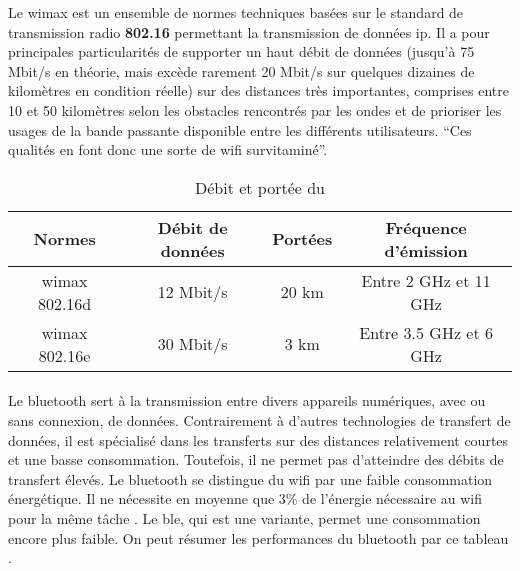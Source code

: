 Le \gls{wimax} est un ensemble de normes techniques basées sur le standard de transmission radio \textbf{802.16}
permettant la transmission de données \gls{ip}.\newline
Il a pour principales particularités de supporter un haut débit de données (jusqu’à 75 Mbit/s en théorie, mais
excède rarement 20 Mbit/s sur quelques dizaines de kilomètres en condition réelle) sur des distances très importantes,
comprises entre 10 et 50 kilomètres selon les obstacles rencontrés par les ondes et de prioriser les usages de
la bande passante disponible entre les différents utilisateurs. \enquote{Ces qualités en font donc une sorte
    de \gls{wifi} survitaminé}{\cite{wimax}}.

\begin{table}[H]
    \centering
    \begin{tabular}{|c|c|c|c|}
        \hline
        \rowcolor{tableColorDark} Normes & Débit de données & Portées & Fréquence d'émission   \\
        \hline

        \gls{wimax} 802.16d              & 12 Mbit/s        & 20 km   & Entre 2 GHz et 11 GHz  \\\hline
        \gls{wimax} 802.16e              & 30 Mbit/s        & 3 km    & Entre 3.5 GHz et 6 GHz \\\hline
    \end{tabular}
    \label{tab:debitPorteeWimax}
    \caption{Débit et portée du }
    \nocite{debitPortee}
\end{table}


\paragraph{}
\label{sec:bluetooth}

Le \gls{bluetooth} sert à la transmission entre divers appareils numériques, avec ou sans connexion,
de données. Contrairement à d'autres technologies de transfert de données, il est
spécialisé dans les transferts sur des distances relativement courtes et une basse
consommation. Toutefois, il ne permet pas d'atteindre des débits de transfert élevés.\newline
Le \gls{bluetooth} se distingue du \gls{wifi} par une faible consommation énergétique. Il
ne nécessite en moyenne que 3\% de l'énergie nécessaire au \gls{wifi} pour la même tâche \cite{bluetoothConsumption}.
Le \gls{ble}, qui est une variante, permet une consommation encore plus faible.\newline
On peut résumer les performances du \gls{bluetooth} par ce tableau \cite{debitPortee, ble}.

